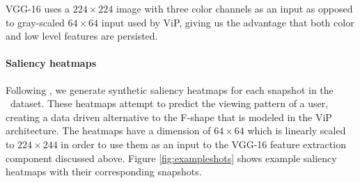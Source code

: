 VGG-16 uses a $224\times224$ image with three color channels as an input
as opposed to gray-scaled $64\times64$ input used by ViP, giving us the advantage that both color and low level features are persisted. 


\paragraph{Saliency heatmaps}
Following \cite{shan2017two}, we generate synthetic saliency heatmaps for each snapshot in the \datasetname~data\-set. These heatmaps attempt to predict the viewing pattern of a user, creating a data driven alternative to the F-shape that is modeled in the ViP architecture. 
The heatmaps have a dimension of $64\times64$ which is linearly scaled to $224\times244$ in order to use them as an input to the VGG-16 feature extraction component discussed above.
Figure \ref{fig:exampleshots} shows example saliency heatmaps with their corresponding snapshots.

